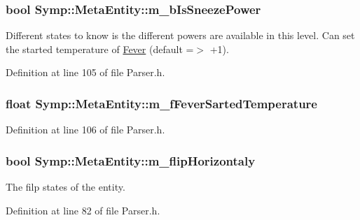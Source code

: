 \hypertarget{struct_symp_1_1_meta_entity_abb18395677970e52429cff9fea1c3c49}{
\subsubsection[{m\-\_\-b\-Is\-Sneeze\-Power}]{\setlength{\rightskip}{0pt plus 5cm}bool Symp\-::\-Meta\-Entity\-::m\-\_\-b\-Is\-Sneeze\-Power}}\label{struct_symp_1_1_meta_entity_abb18395677970e52429cff9fea1c3c49}
Different states to know is the different powers are available in this level. Can set the started temperature of \hyperlink{class_symp_1_1_fever}{Fever} (default =$>$ +1). 

Definition at line 105 of file Parser.\-h.

\hypertarget{struct_symp_1_1_meta_entity_a8d7d76861eb81d12422422d4eafa621c}{
\subsubsection[{m\-\_\-f\-Fever\-Sarted\-Temperature}]{\setlength{\rightskip}{0pt plus 5cm}float Symp\-::\-Meta\-Entity\-::m\-\_\-f\-Fever\-Sarted\-Temperature}}\label{struct_symp_1_1_meta_entity_a8d7d76861eb81d12422422d4eafa621c}


Definition at line 106 of file Parser.\-h.

\hypertarget{struct_symp_1_1_meta_entity_adb5c42f708d253e66adac60a5b8ceb8a}{
\subsubsection[{m\-\_\-flip\-Horizontaly}]{\setlength{\rightskip}{0pt plus 5cm}bool Symp\-::\-Meta\-Entity\-::m\-\_\-flip\-Horizontaly}}\label{struct_symp_1_1_meta_entity_adb5c42f708d253e66adac60a5b8ceb8a}
The filp states of the entity. 

Definition at line 82 of file Parser.\-h.

